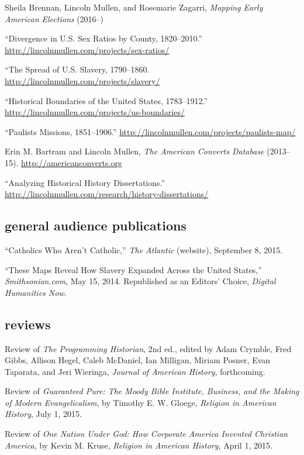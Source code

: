 \documentclass[11pt]{article}
\begin{document}
Sheila Brennan, Lincoln Mullen, and Rosemarie Zagarri, 
\emph{Mapping Early American Elections} (2016--)

``Divergence in U.S. Sex Ratios by County, 1820--2010.'' \url{http://lincolnmullen.com/projects/sex-ratios/}

``The Spread of U.S.  Slavery, 1790--1860. 
\url{http://lincolnmullen.com/projects/slavery/}

``Historical Boundaries of the United States, 1783--1912.'' \url{http://lincolnmullen.com/projects/us-boundaries/}

``Paulists Missions, 1851--1906.'' \url{http://lincolnmullen.com/projects/paulists-map/}

Erin M. Bartram and Lincoln Mullen, \emph{The American Converts Database} 
(2013--15). \url{http://americanconverts.org}

``Analyzing Historical History Dissertations.'' \url{http://lincolnmullen.com/research/history-dissertations/}

\subsection{general audience publications}\label{selected-online-essays}

``Catholics Who Aren't Catholic,'' \emph{The Atlantic} (website), September 8, 
2015.

``These Maps Reveal How Slavery Expanded Across the United States,''
\emph{Smithsonian.com}, May 15, 2014. Republished as an Editors' Choice,
\emph{Digital Humanities Now}.

\subsection{reviews}\label{book-reviews}

Review of \emph{The Programming Historian}, 2nd ed., edited by
Adam Crymble, Fred Gibbs, Allison Hegel, Caleb McDaniel, Ian Milligan, Miriam 
Posner, Evan Taparata, and Jeri Wieringa, \emph{Journal of American History}, 
forthcoming.

Review of \emph{Guaranteed Pure: The Moody Bible Institute, Business, and the 
  Making of Modern Evangelicalism}, by Timothy E. W. Gloege, \emph{Religion in 
  American History}, July 1, 2015.

Review of \emph{One Nation Under God: How Corporate America Invented Christian 
  America}, by Kevin M. Kruse, \emph{Religion in American History}, April 1, 
2015.
\end{document}
